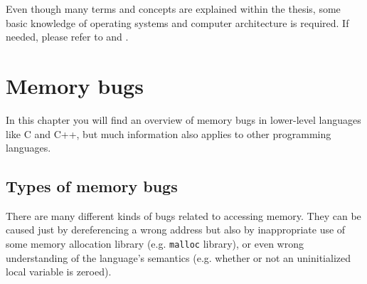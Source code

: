 \documentclass[shortabstract, manyadvisors, english, mgr]{iithesis}
\theoremstyle{definition} \newtheorem*{definition}{Definicja}
\theoremstyle{definition} \newtheorem*{example}{Przykład}
\theoremstyle{definition} \newtheorem*{remark}{Uwaga}
\begin{document}
Even though many terms and concepts are explained within the thesis, some basic knowledge of operating systems and computer architecture is required. If needed, please refer to \cite{bib:csapp} and \cite{bib:stallings}.

\chapter{Memory bugs}
\label{chapter:2}
In this chapter you will find an overview of memory bugs in lower-level languages like C and C++, but much information also applies to other programming languages.

\section{Types of memory bugs}
There are many different kinds of bugs related to accessing memory. They can be caused just by dereferencing a wrong address but also by inappropriate use of some memory allocation library (e.g. \texttt{malloc} library), or even wrong understanding of the language's semantics (e.g. whether or not an uninitialized local variable is zeroed).
\end{document}
